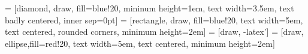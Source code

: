 

\usepackage{ulem}
\usepackage{mathcomp}  %
\usepackage{tikz}
\usepackage{smartdiagram}
\usetikzlibrary{shapes,arrows}
\usetikzlibrary{snakes}



 = [diamond, draw, fill=blue!20, mininum height=1em,
   text width=3.5em, text badly centered, inner sep=0pt]
 = [rectangle, draw, fill=blue!20,
   text width=5em, text centered, rounded corners, minimum height=2em]
 = [draw, -latex']
 = [draw, ellipse,fill=red!20, text width=5em, text centered,
   minimum height=2em]

   \usepackage{tabularx}
\usepackage[no-math]{fontspec}

\usepackage{booktabs}  %


\usepackage{xeCJK}                       %
\usepackage{xunicode,xltxtra,beamerthemesplit}

\makeatletter %
\def\@cite#1#2{\textsuperscript{[{#1\if@tempswa , #2\fi}]}}

\makeatletter %
\def\@cite#1#2{\textsuperscript{[{#1\if@tempswa , #2\fi}]}}

\setmainfont[BoldFont=Times New Roman]{Times New Roman} %

\setmonofont{YaHei_Monaco}






